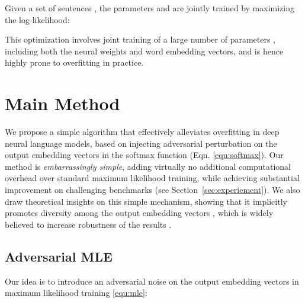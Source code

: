 \documentclass{article}
\begin{document}
Given a set of sentences , 
the parameters  and  are jointly trained by maximizing the log-likelihood:  

This optimization involves joint training of 
a large number of parameters , including both the neural weights and word embedding vectors,  and is hence highly prone to overfitting in practice. 






\iffalse 
Further,  is specified by a softmax function 

where  is the  coefficients of the softmax and 
 is its -th column. 
The bias term is dropped for simplicity. 
It has been found useful to make the weight coefficient  equal the embedding vector  , that is, , if the hidden state dimension  equals the embedding dimension . This yields the  
weight tying softmax function \citep{cite},

Training language models with weight-tying could reduce the total free parameters
substantially and yield significant improvements to the standard neural language model \citep{press2016using, inan2016tying}. 
Then the netowrk is typically trained by minimising the negative log-likelihood:

where  are model parameters.
\fi  
\section{Main Method} \label{sec:main}
We propose a simple 
algorithm that 
effectively  
alleviates overfitting in deep neural language models, 
based on injecting adversarial perturbation on the output embedding vectors  in  the softmax function (Eqn. \eqref{equ:softmax}).  
Our method is \emph{embarrassingly simple}, adding virtually no additional computational overhead over standard maximum likelihood training, 
while achieving substantial improvement on challenging benchmarks (see Section~\ref{sec:experiement}). 
We also draw theoretical insights on this simple mechanism,  
showing that it implicitly 
promotes diversity among the output embedding vectors ,
which is widely believed to increase robustness of the results \citep[e.g.,][]{cortes1995support, liu2018learning, gao2018representation}. 




\subsection{Adversarial MLE} 

Our idea is to introduce an adversarial noise on the output embedding vectors  in maximum likelihood training \eqref{equ:mle}: 
\end{document}
